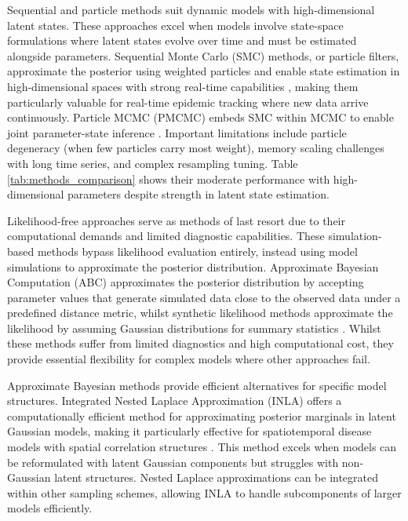 \documentclass{article}
\begin{document}
Sequential and particle methods suit dynamic models with high-dimensional latent states.
These approaches excel when models involve state-space formulations where latent states evolve over time and must be estimated alongside parameters.
Sequential Monte Carlo (SMC) methods, or particle filters, approximate the posterior using weighted particles and enable state estimation in high-dimensional spaces with strong real-time capabilities \citep{doucet2001introduction}, making them particularly valuable for real-time epidemic tracking where new data arrive continuously.
Particle MCMC (PMCMC) embeds SMC within MCMC to enable joint parameter-state inference \citep{andrieu2010particle, endo2019introduction}.
Important limitations include particle degeneracy (when few particles carry most weight), memory scaling challenges with long time series, and complex resampling tuning.
Table \ref{tab:methods_comparison} shows their moderate performance with high-dimensional parameters despite strength in latent state estimation.

Likelihood-free approaches serve as methods of last resort due to their computational demands and limited diagnostic capabilities.
These simulation-based methods bypass likelihood evaluation entirely, instead using model simulations to approximate the posterior distribution.
Approximate Bayesian Computation (ABC) approximates the posterior distribution by accepting parameter values that generate simulated data close to the observed data under a predefined distance metric, whilst synthetic likelihood methods approximate the likelihood by assuming Gaussian distributions for summary statistics \citep{beaumont2002approximate, wood2010statistical, price2018bayesian}.
Whilst these methods suffer from limited diagnostics and high computational cost, they provide essential flexibility for complex models where other approaches fail.

Approximate Bayesian methods provide efficient alternatives for specific model structures.
Integrated Nested Laplace Approximation (INLA) offers a computationally efficient method for approximating posterior marginals in latent Gaussian models, making it particularly effective for spatiotemporal disease models with spatial correlation structures \citep{rue2017bayesian}.
This method excels when models can be reformulated with latent Gaussian components but struggles with non-Gaussian latent structures.
Nested Laplace approximations can be integrated within other sampling schemes, allowing INLA to handle subcomponents of larger models efficiently.
\end{document}
